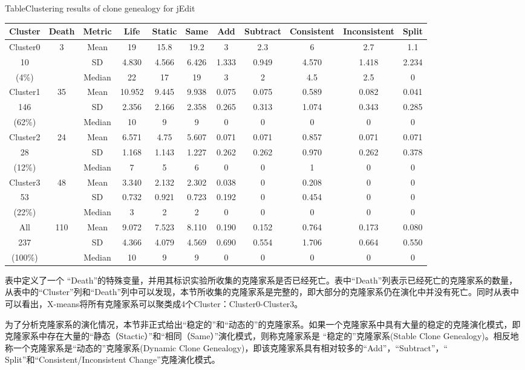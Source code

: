 \begin{table} [h]
{Table$\!$}{Clustering results of clone genealogy for jEdit}
\vspace{0.5em}
\centering
\footnotesize
\begin{tabular}{ccccccccccc}
\toprule[1.5pt]
Cluster&Death&Metric&Life&	Static&	Same&	Add	&Subtract&	Consistent&	Inconsistent&	Split\\
\midrule[1pt]
Cluster0&\multirow{3}{*}{3}&Mean	&19	&15.8	&19.2	&3	&2.3&	6	&2.7&	1.1\\ 
10&&SD&4.830&4.566&	6.426&1.333&	0.949&	4.570&	1.418&2.234\\ 
(4\%)&&Median	&22&	17&	19&	3&	2	&4.5	&2.5&	0\\ 
\hline
Cluster1&\multirow{3}{*}{35}&Mean	&10.952&	9.445&	9.938&	0.075	&0.075	&0.589&	0.082&	0.041\\ 
146&&SD&2.356&2.166&2.358&0.265	&0.313&	1.074&	0.343&	0.285\\ 
(62\%)&&Median&	10&	9&	9	&0&	0	&0	&0&	0\\ 
\hline
Cluster2&\multirow{3}{*}{24}&Mean	&6.571&	4.75&	5.607&	0.071&	0.071&	0.857&	0.071&	0.071\\ 
28&&SD&1.168&	1.143&1.227&0.262&0.262&0.970&0.262&0.378\\ 
(12\%)&&Median	&7	&5	&6&	0	&0	&1&	0&	0\\ \hline
Cluster3&\multirow{3}{*}{48}&Mean	&3.340&	2.132&	2.302&	0.038&	0	&0.208&	0	&0\\ 
53&&SD&	0.732&0.921&0.723&	0.192&	0&	0.454&0	&0\\ 
(22\%)&&Median	&3&	2&	2	&0&	0&	0	&0&	0\\ \hline
All&\multirow{3}{*}{110}&Mean	&9.072&7.523&	8.110&0.190&	0.152&	0.764	&0.173&	0.080\\ 
237&&SD&4.366&	4.079&4.569&0.690&	0.554&	1.706&0.664	&0.550\\ 
(100\%)&&Median	&10	&9	&9	&0	&0	&0	&0	&0\\
\bottomrule[1.5pt]
\end{tabular}
\end{table} 

表中定义了一个 “Death”的特殊变量，并用其标识实验所收集的克隆家系是否已经死亡。表中“Death”列表示已经死亡的克隆家系的数量，从表中的“Cluster”列和“Death”列中可以发现，本节所收集的克隆家系是完整的，即大部分的克隆家系仍在演化中并没有死亡。同时从表中可以看出，X-means将所有克隆家系可以聚类成4个Cluster：Cluster0-Cluster3。

为了分析克隆家系的演化情况，本节非正式给出“稳定的”和“动态的”的克隆家系。如果一个克隆家系中具有大量的稳定的克隆演化模式，即克隆家系中存在大量的“静态（Stactic）”和“相同（Same）”演化模式，则称克隆家系是 “稳定的”克隆家系(Stable Clone Genealogy)。相反地称一个克隆家系是“动态的”克隆家系(Dynamic Clone Genealogy)，即该克隆家系具有相对较多的“Add”，“Subtract”，“ Split”和“Consistent/Inconsistent Change”克隆演化模式。

